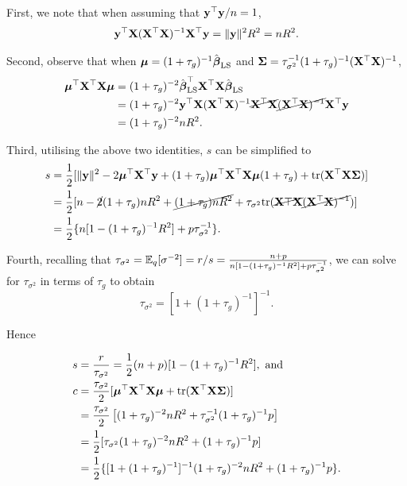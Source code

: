 \documentclass{amsart}[12pt]
\begin{document}
First, we note that when assuming that ${\bf y}^\top {\bf y} / n = 1$,
\[{\bf y}^\top {\bf X} ({\bf X}^\top {\bf X})^{-1} {\bf X}^\top {\bf y} =\|{\bf y}\|^2 R^2 = n R^2.\]

Second, observe that when ${\boldsymbol \mu} = (1 + \tau_g)^{-1} \hat{{\boldsymbol \beta}}_{\text{LS}}$ and ${\boldsymbol \Sigma} = \tau_{\sigma^2}^{-1} (1 + \tau_g)^{-1} ({\bf X}^\top {\bf X})^{-1}$,
\begin{align*}
	{\boldsymbol\mu}^\top {\bf X}^\top {\bf X} {\boldsymbol\mu} & = (1 + \tau_g)^{-2} \hat{{\boldsymbol \beta}}_{\text{LS}}^\top {\bf X}^\top {\bf X} \hat{{\boldsymbol \beta}}_{\text{LS}}                                                        \\
	                            & = (1 + \tau_g)^{-2} {\bf y}^\top {\bf X} ({\bf X}^\top {\bf X})^{-1} \cancel{{\bf X}^\top {\bf X}} \cancel{({\bf X}^\top {\bf X})^{-1}} {\bf X}^\top {\bf y} \\
	                            & = (1 + \tau_g)^{-2} n R^2.                                    
\end{align*}

Third, utilising the above two identities, $s$ can be simplified to
\begin{align*}
	s & = \frac{1}{2} [\|{\bf y}\|^2 - 2 {\boldsymbol \mu}^\top {\bf X}^\top {\bf y} + (1 + \tau_g) {\boldsymbol \mu}^\top {\bf X}^\top {\bf X} {\boldsymbol\mu} (1 + \tau_g) +  \text{tr} ({\bf X}^\top {\bf X} {\boldsymbol\Sigma})]                 \\
	  & = \frac{1}{2} [n - \cancel{2} (1 + \tau_g) n R ^2 + \cancel{(1 + \tau_g) n R^2} + \tau_{\sigma^2} \text{tr} (\cancel{{\bf X}\top {\bf X}} \cancel{({\bf X}^\top {\bf X})^{-1}})] \\
	  & = \frac{1}{2} \{ n[1 - (1 + \tau_g)^{-1} R^2] + p \tau_{\sigma^2}^{-1} \}.
\end{align*}

Fourth, recalling that $\tau_{\sigma^2} = \mathbb{E}_q [\sigma^{-2}] = r/s = \frac{n+p}{n[1 - (1 + \tau_g)^{-1} R^2] + p \tau_{\sigma^2}^{-1}}$, we can solve for $\tau_{\sigma^2}$ in terms of $\tau_g$ to obtain
\[
	\tau_{\sigma^2} = [1 + (1 + \tau_g)^{-1}]^{-1}.
\]

Hence

\begin{align*}
	s & = \frac{r}{\tau_{\sigma^2}} = \frac{1}{2} (n + p) [1 - (1 + \tau_g)^{-1} R^2], \text{ and } \\
	c & = \frac{\tau_{\sigma^2}}{2}[{\boldsymbol \mu}^\top {\bf X}^\top {\bf X} {\boldsymbol\mu} + \text{tr} ({\bf X}^\top {\bf X} {\boldsymbol\Sigma})]                      \\
	  & = \frac{\tau_{\sigma^2}}{2}\left[(1 + \tau_g)^{-2} n R^2 + \tau_{\sigma^2}^{-1} (1 + \tau_g)^{-1} p\right] \\
	  & = \frac{1}{2} [ \tau_{\sigma^2} (1 + \tau_g)^{-2} n R^2 + (1 + \tau_g)^{-1} p]                             \\
	  & = \frac{1}{2} \{ [1 + (1 + \tau_g)^{-1}]^{-1} (1 + \tau_g)^{-2} n R^2 + (1 + \tau_g)^{-1} p\}.
\end{align*}
\end{document}
